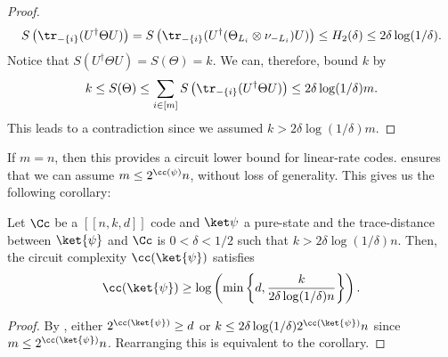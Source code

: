 \documentclass{toc}
\begin{document}
\begin{proof}
\begin{align}
    S \left( \tr_{-\{i\}}(U^\dagger \Theta U)  \right) = S \left( \tr_{-\{i\}}(U^\dagger (\Theta_{L_i}\otimes \nu_{-L_i}) U)  \right) \leq H_2(\delta) \leq 2 \delta \log(1/\delta).
\end{align}
Notice that $S(U^\dagger \Theta U)=S(\Theta) = k$. We can, therefore, bound $k$ by 
\begin{align}
    k \leq S(\Theta) \leq \sum_{i \in [m]} S \left( \tr_{-\{i\}}(U^\dagger \Theta U)  \right) \leq 2 \delta \log(1/\delta) m.
\end{align}
This leads to a contradiction since we assumed $k > 2\delta \log(1/\delta) m$.
\end{proof}

If $m = n$, then this provides a circuit lower bound for linear-rate codes.  ensures that we can assume $m \leq 2^{\cc(\psi)} n$, without loss of generality. 
This gives us the following corollary:


\begin{corollary}
\label{cor:lin-rate-and-pure}
Let $\Cc$ be a $[[n,k,d]]$ code and $\ket \psi$ a pure-state and the trace-distance between $\ket{\psi}$ and $\Cc$ is $0 < \delta < 1/2$ such that $k > 2 \delta \log(1/\delta) n$. Then, the circuit complexity $\cc(\ket{\psi})$ satisfies
\begin{align}
    \cc(\ket{\psi}) \geq \log \left( \min \left\{ d, \frac{k}{2 \delta \log(1/\delta) n} \right\} \right).
\end{align}
\end{corollary}

\begin{proof}
By , either $2^{\cc(\ket{\psi})} \geq d$ or $k \leq 2 \delta \log(1/\delta) 2^{\cc(\ket{\psi})} n$ since $m \leq 2^{\cc(\ket{\psi})} n$. Rearranging this is equivalent to the corollary.
\end{proof}
\end{document}
